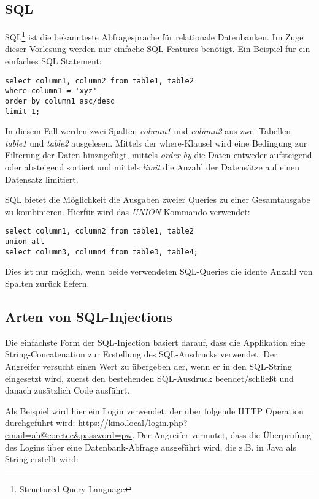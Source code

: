 \subsection{SQL}

SQL\footnote{Structured Query Language} ist die bekannteste Abfragesprache für relationale Datenbanken. Im Zuge dieser Vorlesung werden nur einfache SQL-Features benötigt. Ein Beispiel für ein einfaches SQL Statement:

\begin{verbatim}
select column1, column2 from table1, table2
where column1 = 'xyz'
order by column1 asc/desc
limit 1;
\end{verbatim}

In diesem Fall werden zwei Spalten \textit{column1} und \textit{column2} aus zwei Tabellen \textit{table1} und \textit{table2} ausgelesen. Mittels der where-Klausel wird eine Bedingung zur Filterung der Daten hinzugefügt, mittels \textit{order by} die Daten entweder aufsteigend oder absteigend sortiert und mittels \textit{limit} die Anzahl der Datensätze auf einen Datensatz limitiert.

SQL bietet die Möglichkeit die Ausgaben zweier Queries zu einer Gesamtausgabe zu kombinieren. Hierfür wird das \textit{UNION} Kommando verwendet:

\begin{verbatim}
select column1, column2 from table1, table2
union all
select column3, column4 from table3, table4;
\end{verbatim}

Dies ist nur möglich, wenn beide verwendeten SQL-Queries die idente Anzahl von Spalten zurück liefern.

\subsection{Arten von SQL-Injections}

Die einfachste Form der SQL-Injection basiert darauf, dass die Applikation eine String-Concatenation zur Erstellung des SQL-Ausdrucks verwendet. Der Angreifer versucht einen Wert zu übergeben der, wenn er in den SQL-String eingesetzt wird, zuerst den bestehenden SQL-Ausdruck beendet/schließt und danach zusätzlich Code ausführt.

Als Beispiel wird hier ein Login verwendet, der über folgende HTTP Operation durchgeführt wird: \url{https://kino.local/login.php?email=ah@coretec&password=pw}. Der Angreifer vermutet, dass die Überprüfung des Logins über eine Datenbank-Abfrage ausgeführt wird, die z.B. in Java als String erstellt wird:

